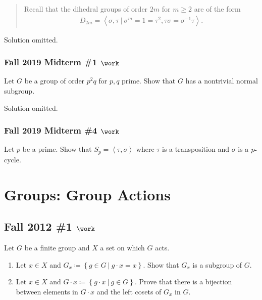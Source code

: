 \begin{quote}
Recall that the dihedral groups of order \(2m\) for \(m\geq 2\) are of
the form
\begin{align*}
D_{2m} = \left\langle{\sigma, \tau {~\mathrel{\Big|}~}\sigma^m = 1 = \tau^2, \tau \sigma = \sigma^{-1}\tau}\right\rangle
.\end{align*}
\end{quote}

Solution omitted.

\hypertarget{fall-2019-midterm-1-work}{%
\subsubsection{\texorpdfstring{Fall 2019 Midterm \#1
\(\work\)}{Fall 2019 Midterm \#1 \textbackslash work}}\label{fall-2019-midterm-1-work}}

Let \(G\) be a group of order \(p^2q\) for \(p, q\) prime. Show that
\(G\) has a nontrivial normal subgroup.

Solution omitted.

\hypertarget{fall-2019-midterm-4-work}{%
\subsubsection{\texorpdfstring{Fall 2019 Midterm \#4
\(\work\)}{Fall 2019 Midterm \#4 \textbackslash work}}\label{fall-2019-midterm-4-work}}

Let \(p\) be a prime. Show that
\(S_p = \left\langle{\tau, \sigma}\right\rangle\) where \(\tau\) is a
transposition and \(\sigma\) is a \(p{\hbox{-}}\)cycle.

\hypertarget{groups-group-actions}{%
\section{Groups: Group Actions}\label{groups-group-actions}}

\hypertarget{fall-2012-1-work}{%
\subsection{\texorpdfstring{Fall 2012 \#1
\(\work\)}{Fall 2012 \#1 \textbackslash work}}\label{fall-2012-1-work}}

Let \(G\) be a finite group and \(X\) a set on which \(G\) acts.

\begin{enumerate}
\def\labelenumi{\alph{enumi}.}
\item
  Let \(x\in X\) and
  \(G_x \coloneqq\left\{{g\in G {~\mathrel{\Big|}~}g\cdot x = x}\right\}\).
  Show that \(G_x\) is a subgroup of \(G\).
\item
  Let \(x\in X\) and
  \(G\cdot x \coloneqq\left\{{g\cdot x {~\mathrel{\Big|}~}g\in G}\right\}\).
  Prove that there is a bijection between elements in \(G\cdot x\) and
  the left cosets of \(G_x\) in \(G\).
\end{enumerate}


